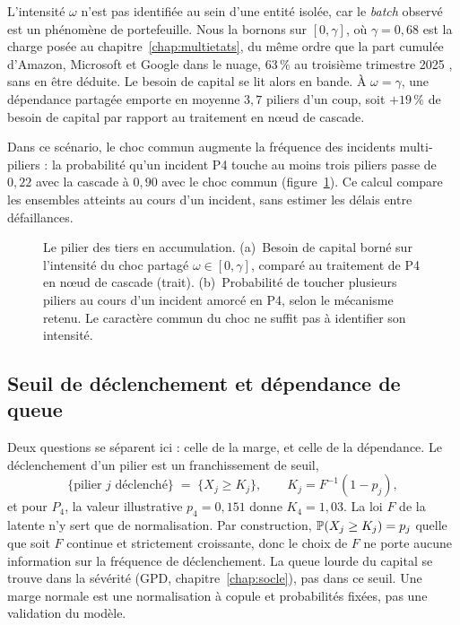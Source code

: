L'intensité $\omega$ n'est pas identifiée au sein d'une entité isolée, car le \emph{batch}
observé est un phénomène de portefeuille. Nous la bornons sur $[0,\gamma]$, où $\gamma=0{,}68$ est la charge
posée au chapitre~\ref{chap:multietats}, du même ordre que la part cumulée d'Amazon, Microsoft et Google dans
le nuage, $63\,\%$ au troisième trimestre 2025 \citep{synergy2025}, sans en être déduite. Le besoin de capital se lit alors en bande. À $\omega=\gamma$, une
dépendance partagée emporte en moyenne $3{,}7$ piliers d'un coup, soit $+19\,\%$ de besoin de capital par rapport
au traitement en n\oe{}ud de cascade.

Dans ce scénario, le choc commun augmente la fréquence des
incidents multi-piliers : la probabilité qu'un incident P4 touche au moins trois piliers passe de
$0{,}22$ avec la cascade à $0{,}90$ avec le choc commun (figure~\ref{fig:p4}). Ce calcul compare les
ensembles atteints au cours d'un incident, sans estimer les délais entre défaillances.

\begin{figure}[H]\centering
{}
\caption{Le pilier des tiers en accumulation. (a)~Besoin de capital borné sur l'intensité du choc partagé
$\omega\in[0,\gamma]$, comparé au traitement de P4 en n\oe{}ud de cascade (trait).
(b)~Probabilité de toucher plusieurs piliers au cours d'un incident amorcé en P4, selon le
mécanisme retenu. Le caractère commun du choc ne suffit pas à identifier son intensité.}
\label{fig:p4}
\end{figure}

\subsection{Seuil de déclenchement et dépendance de queue}
\label{sec:p4-seuil}

Deux questions se séparent ici : celle de la marge, et celle de la dépendance. Le déclenchement d'un
pilier est un franchissement de seuil,
\begin{equation}
  \{\text{pilier } j \text{ déclenché}\} \;=\; \{X_j \ge K_j\},
  \qquad K_j = F^{-1}(1-p_j),
  \label{eq:seuil-Kj}
\end{equation}
et pour $P_4$, la valeur illustrative $p_4=0{,}151$ donne $K_4=1{,}03$. La loi $F$ de la latente n'y sert que de
normalisation. Par construction, $\mathbb{P}(X_j\ge K_j)=p_j$ quelle que soit $F$ continue et strictement
croissante, donc le choix de $F$ ne porte aucune information sur la fréquence de déclenchement. La
queue lourde du capital se trouve dans la sévérité (GPD, chapitre~\ref{chap:socle}), pas dans ce
seuil. Une marge normale est une normalisation à copule et probabilités fixées, pas une validation du modèle.

